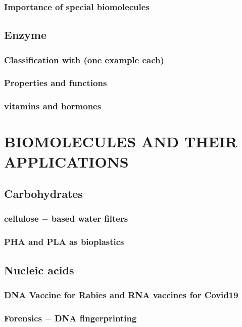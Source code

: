 \documentclass{article}
\begin{document}
	\subsubsection{Importance of special biomolecules}

	\subsection{Enzyme}
	\subsubsection{Classification with (one example each)}
	\subsubsection{Properties and functions}
	\subsubsection{vitamins and hormones}

	\section{BIOMOLECULES AND THEIR APPLICATIONS}
	\subsection{Carbohydrates}
	\subsubsection{cellulose $-$ based water filters}
	\subsubsection{PHA and PLA as bioplastics}

	\subsection{Nucleic acids}
	\subsubsection{DNA Vaccine for Rabies and RNA vaccines for Covid19}
	\subsubsection{Forensics $-$ DNA fingerprinting}
\end{document}
